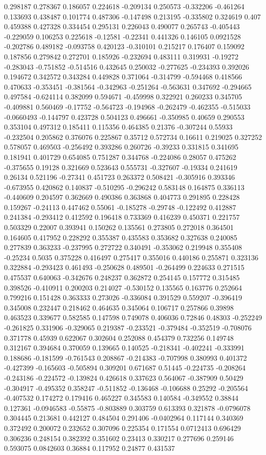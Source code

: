 0.298187 0.278367 0.186057 0.224618 -0.209134 0.250573 -0.332206 -0.461264 0.133693 0.438487 0.101774 0.487306 -0.147498 0.213195 -0.335802 0.324619 0.407 0.459388 0.427328 0.334454 0.295131 0.226043 0.490077 0.265743 -0.405443 -0.229059 0.106253 0.225618 -0.12581 -0.22341 0.441326 0.146105 0.0921528 -0.202786 0.489182 -0.093758 0.420123 -0.310101 0.215217 0.176407 0.159092 0.187856 0.279842 0.272701 0.185926 -0.232694 0.483111 0.319931 -0.19272 -0.283043 -0.751852 -0.514516 0.432645 0.250032 -0.277625 -0.234393 0.392026 0.194672 0.342572 0.343284 0.449828 0.371064 -0.314799 -0.594468 0.418566 0.470633 -0.353451 -0.381564 -0.342963 -0.251264 -0.563631 0.347692 -0.294665 0.497584 -0.624114 0.382099 0.594671 -0.459998 0.322921 0.260233 0.345705 -0.409881 0.560469 -0.17752 -0.564723 -0.194968 -0.262479 -0.462355 -0.515033 -0.0660493 -0.144797 0.423728 0.504123 0.496661 -0.350985 0.40659 0.290553 0.353104 0.497312 0.185411 0.115356 0.464385 0.21376 -0.307244 0.55933 -0.232504 0.205862 0.376076 0.225867 0.35712 0.572734 0.16611 0.219025 0.327252 0.578057 0.469503 -0.256492 0.393286 0.260726 -0.39233 0.331815 0.341695 0.181941 0.401729 0.654085 0.751287 0.344768 -0.224086 0.28057 0.475262 -0.375655 0.19128 0.321669 0.523643 0.555731 -0.327607 -0.19334 0.241619 0.26134 0.521196 -0.27341 0.451723 0.263372 0.508421 -0.305916 0.393346 -0.673955 0.420862 0.140837 -0.510295 -0.296242 0.583148 0.164875 0.336113 -0.440609 0.204597 0.362669 0.490386 0.363868 0.404773 0.291895 0.228428 0.159267 -0.24113 0.447462 0.55061 -0.185278 -0.29748 -0.122492 0.412887 0.241384 -0.293412 0.412592 0.196418 0.733369 0.416239 0.450371 0.221757 0.503329 0.22007 0.393941 0.150262 0.135561 0.273805 0.272018 0.364501 0.164605 0.417952 0.228292 0.355387 0.435583 0.353682 0.327638 0.240085 0.277839 0.363233 -0.237995 0.272722 0.340491 -0.353062 0.219948 0.355408 -0.25234 0.5035 0.375228 0.416497 0.275417 0.355016 0.440186 0.255871 0.323136 0.322884 -0.293423 0.461493 -0.250628 0.489501 -0.264499 0.224633 0.271515 0.475537 0.640063 -0.342676 0.248237 0.362872 0.254145 0.157772 0.315485 0.398526 -0.410911 0.200203 0.214027 -0.530152 0.135565 0.163776 0.252664 0.799216 0.151428 0.363333 0.273026 -0.336084 0.391529 0.559207 -0.396419 0.345008 0.232447 0.218462 0.464635 0.345064 0.106717 0.257866 0.39898 0.463523 0.339677 0.582585 0.147598 0.749078 0.406036 0.72846 0.48303 -0.252249 -0.261825 0.331906 -0.329065 0.219387 -0.233521 -0.379484 -0.352519 -0.708076 0.371778 0.45939 0.622067 0.302604 0.252088 0.454379 0.732256 0.149748 0.312167 0.394684 0.370059 0.139665 0.140525 -0.218341 -0.402241 -0.333991 0.188686 -0.181599 -0.761543 0.208867 -0.214383 -0.707998 0.380993 0.401372 -0.427399 -0.165603 -0.505894 0.309201 0.671687 0.51445 -0.224735 -0.208264 -0.243186 -0.224572 -0.139824 0.426618 0.337623 0.564067 -0.387909 0.50429 -0.304917 -0.495352 0.358247 -0.511852 -0.136468 -0.106688 0.25292 -0.205564 -0.407532 0.174272 0.179416 0.465227 0.345583 0.140584 -0.349552 0.38844 0.127361 -0.0946583 -0.55875 -0.803889 0.303759 0.613393 0.321878 -0.0796078 0.304445 0.213681 0.442127 0.484504 0.291406 -0.0402964 0.117144 0.340369 0.372492 0.200072 0.232652 0.307096 0.225354 0.171554 0.0712413 0.696429 0.306236 0.248154 0.382392 0.351602 0.23413 0.330217 0.277696 0.259146 0.593075 0.0842603 0.36884 0.117952 0.24877 0.431537 